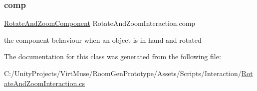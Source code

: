 \subsubsection{\texorpdfstring{comp}{comp}}
{\footnotesize\ttfamily \mbox{\hyperlink{class_rotate_and_zoom_component}{Rotate\+And\+Zoom\+Component}} Rotate\+And\+Zoom\+Interaction.\+comp\hspace{0.3cm}{\ttfamily [private]}}



the component behaviour when an object is in hand and rotated 



The documentation for this class was generated from the following file\+:\begin{DoxyCompactItemize}
\item 
C\+:/\+Unity\+Projects/\+Virt\+Muse/\+Room\+Gen\+Prototype/\+Assets/\+Scripts/\+Interaction/\mbox{\hyperlink{_rotate_and_zoom_interaction_8cs}{Rotate\+And\+Zoom\+Interaction.\+cs}}\end{DoxyCompactItemize}
